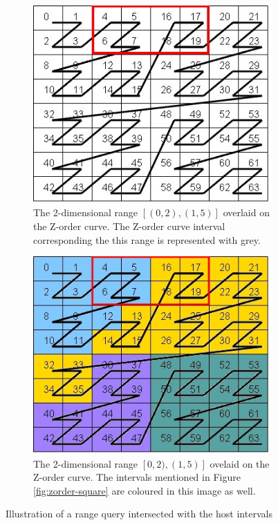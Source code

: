 \documentclass[11pt,a4paper]{globis-book}
\begin{document}
\begin{figure}[t]
    \centering
    \begin{subfigure}[b]{0.4\linewidth}
        \includegraphics[width = \linewidth]{images/zordering-range}
        \caption{The 2-dimensional range $[(0, 2), (1, 5)]$ overlaid on the Z-order curve. The Z-order curve interval corresponding the this range is represented with grey.}
        \label{fig:range-zorder}
    \end{subfigure}%
    \qquad
    \begin{subfigure}[b]{0.4\linewidth}
        \includegraphics[width = \linewidth]{images/zordering-range-intervals}
        \caption{The 2-dimensional range $[{0, 2), (1, 5)}]$ ovelaid on the Z-order curve. The intervals mentioned in Figure \ref{fig:zorder-square} are coloured in this image as well.}
        \label{fig:range-zorder-intervals}
    \end{subfigure}
    \caption{Illustration of a range query intersected with the host intervals}
    \label{fig:range}
\end{figure}
\end{document}
